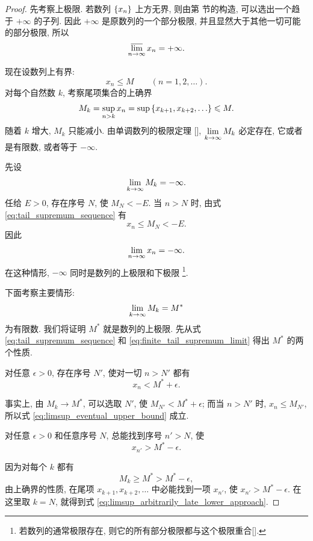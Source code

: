 \begin{proof}
先考察上极限.
若数列 $\{x_{n}\}$ 上方无界, 则由第
 节的构造,
可以选出一个趋于 $+\infty$ 的子列.
因此 $+\infty$ 是原数列的一个部分极限,
并且显然大于其他一切可能的部分极限, 所以
$$
\varlimsup\limits_{n \to \infty}x_n=+\infty.
$$

现在设数列上有界:
$$
x_n\leqslant M\qquad(n=1,2,\ldots).
$$
对每个自然数 $k$, 考察尾项集合的上确界
\begin{equation}\label{eq:tail_supremum_sequence}
M_k=\sup_{n>k}x_n
=\sup\left\{ x_{k+1},x_{k+2},\ldots \right\}\leqslant M.
\end{equation}
随着 $k$ 增大, $M_k$ 只能减小.
由单调数列的极限定理 [],
$\lim\limits_{k \to \infty}M_k$ 必定存在, 它或者是有限数, 或者等于 $-\infty$.

先设
$$
\lim\limits_{k \to \infty}M_k=-\infty.
$$
任给 $E>0$, 存在序号 $N$, 使 $M_N<-E$.
当 $n>N$ 时, 由式 \eqref{eq:tail_supremum_sequence} 有
$$
x_n\leqslant M_N<-E.
$$
因此
$$
\lim\limits_{n \to \infty}x_n=-\infty.
$$
在这种情形, $-\infty$ 同时是数列的上极限和下极限
\footnote{若数列的通常极限存在, 则它的所有部分极限都与这个极限重合[].}.

下面考察主要情形:
\begin{equation}\label{eq:finite_tail_supremum_limit}
\lim\limits_{k \to \infty}M_k=M^*
\end{equation}
为有限数. 我们将证明 $M^*$ 就是数列的上极限.
先从式 \eqref{eq:tail_supremum_sequence} 和
\eqref{eq:finite_tail_supremum_limit} 得出 $M^*$ 的两个性质.

\label{prop:limsup_eventual_upper_bound}
{\kaishu 对任意 $\epsilon>0$, 存在序号 $N'$, 使对一切 $n>N'$ 都有
\begin{equation}\label{eq:limsup_eventual_upper_bound}
x_n<M^*+\epsilon.
\end{equation}}

事实上, 由 $M_k\to M^*$, 可以选取 $N'$, 使
$M_{N'}<M^*+\epsilon$; 而当 $n>N'$ 时,
$x_n\leqslant M_{N'}$, 所以式
\eqref{eq:limsup_eventual_upper_bound} 成立.

\label{prop:limsup_arbitrarily_late_lower_approach}
{\kaishu 对任意 $\epsilon>0$ 和任意序号 $N$,
总能找到序号 $n'>N$, 使
\begin{equation}\label{eq:limsup_arbitrarily_late_lower_approach}
x_{n'}>M^*-\epsilon.
\end{equation}}

因为对每个 $k$ 都有
$$
M_k\geqslant M^*>M^*-\epsilon,
$$
由上确界的性质, 在尾项
$x_{k+1},x_{k+2},\ldots$ 中必能找到一项 $x_{n'}$,
使 $x_{n'}>M^*-\epsilon$.
在这里取 $k=N$, 就得到式
\eqref{eq:limsup_arbitrarily_late_lower_approach}.


\end{proof}
